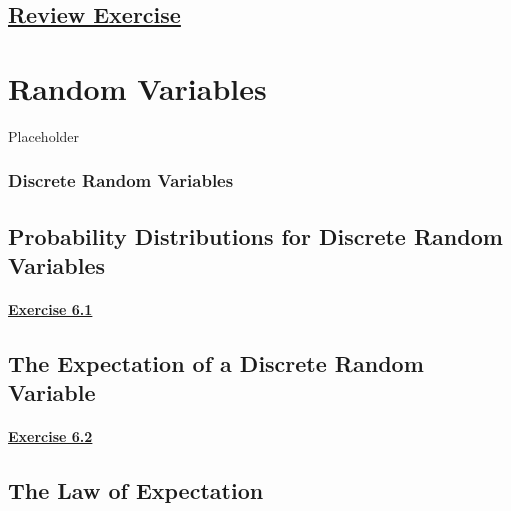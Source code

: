 \documentclass[
  11pt,
]{book}
\begin{document}
\section*{\texorpdfstring{\hyperref[re5a]{Review Exercise}}{Review Exercise}}\label{review-exercise-4}

\chapter{Random Variables}\label{random-variables}

Placeholder

\subsection*{Discrete Random Variables}\label{discrete-random-variables}

\section{Probability Distributions for Discrete Random Variables}\label{probability-distributions-for-discrete-random-variables}

\subsubsection*{\texorpdfstring{\hyperref[ex61a]{Exercise 6.1}}{Exercise 6.1}}\label{exercise-6.1}

\section{The Expectation of a Discrete Random Variable}\label{the-expectation-of-a-discrete-random-variable}

\subsubsection*{\texorpdfstring{\hyperref[ex62a]{Exercise 6.2}}{Exercise 6.2}}\label{exercise-6.2}

\section{The Law of Expectation}\label{the-law-of-expectation}
\end{document}
